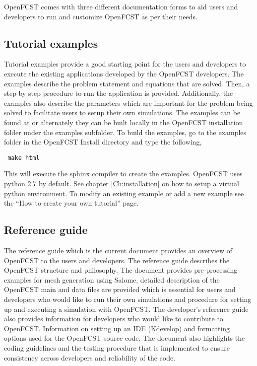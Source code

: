 OpenFCST comes with three different documentation forms to aid users and developers to run and customize OpenFCST as per their needs.

\subsection{Tutorial examples}

Tutorial examples provide a good starting point for the users and developers to execute the existing applications developed by the OpenFCST developers.
The examples describe the problem statement and equations that are solved. Then, a step by step procedure to run the application is provided. Additionally, the examples also describe the  parameters which are important for the problem being solved to facilitate users to setup their own simulations. The examples can be found at  or alternately they can be built locally in the OpenFCST installation folder under the examples subfolder. To build the examples, go to the examples folder in the OpenFCST Install directory and type the following,
\begin{lstlisting}
 make html
\end{lstlisting}
This will execute the sphinx compiler to create the examples. OpenFCST uses python 2.7 by default. See chapter \ref{Ch:installation} on how to setup a virtual python environment. To modify an existing example or add a new example see the ``How to create your own tutorial'' page. 

\subsection{Reference guide}

The reference guide which is the current document provides an overview of OpenFCST to the users and developers. The reference guide describes the OpenFCST structure and philosophy. The document provides pre-processing examples for mesh generation using Salome, detailed description of the OpenFCST main and data files are provided which is essential for users and developers who would like to run their own simulations and procedure for setting up and executing a simulation with OpenFCST. The developer's reference guide also provides information for developers who would like to contribute to OpenFCST. Information on setting up an IDE (Kdevelop) and formatting options used for the OpenFCST source code. The document also highlights the coding guidelines and the testing procedure that is implemented to ensure consistency across developers and reliability of the code.

